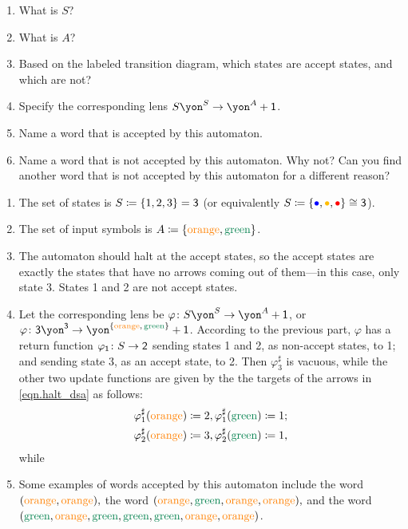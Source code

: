 \documentclass[Book-Poly]{subfiles}
\begin{document}
\begin{exercise}
\begin{enumerate}
	\item What is $S$?
	\item What is $A$?
	\item Based on the labeled transition diagram, which states are accept states, and which are not?
	\item Specify the corresponding lens $S\yon^S\to\yon^A+\1$.
	\item Name a word that is accepted by this automaton.
	\item Name a word that is not accepted by this automaton.
	Why not?
	Can you find another word that is not accepted by this automaton for a different reason?
\qedhere
\end{enumerate}
\begin{solution}
\begin{enumerate}
    \item The set of states is $S\coloneqq\{1,2,3\}=\textsf{3}$ (or equivalently $S\coloneqq\{\bul[blue],\bul[dyellow],\bul[red]\}\iso\3$).
    \item The set of input symbols is $A\coloneqq\{{\color{orange}\text{orange}},{\color{dgreen}\text{green}}\}$.
    \item The automaton should halt at the accept states, so the accept states are exactly the states that have no arrows coming out of them---in this case, only state 3.
    States 1 and 2 are not accept states.
    \item Let the corresponding lens be $\varphi\colon S\yon^S\to\yon^A+\1$, or $\varphi\colon \3\yon^\3\to\yon^{\{{\color{orange}\text{orange}},\,{\color{dgreen}\text{green}}\}}+\1$.
    According to the previous part, $\varphi$ has a return function $\varphi_{\textsf{1}}\colon S\to\textsf{2}$ sending states 1 and 2, as non-accept states, to 1; and sending state 3, as an accept state, to 2.
    Then $\varphi^\sharp_3$ is vacuous, while the other two update functions are given by the the targets of the arrows in \eqref{eqn.halt_dsa} as follows:
    \begin{align*}
        \varphi^\sharp_1({\color{orange}\text{orange}})\coloneqq2&,\varphi^\sharp_1({\color{dgreen}\text{green}})\coloneqq1;\\
        \varphi^\sharp_2({\color{orange}\text{orange}})\coloneqq3&,\varphi^\sharp_2({\color{dgreen}\text{green}})\coloneqq1,
    \end{align*}
    while
    \item Some examples of words accepted by this automaton include the word $({\color{orange}\text{orange}},{\color{orange}\text{orange}}),$ the word $({\color{orange}\text{orange}},{\color{dgreen}\text{green}},{\color{orange}\text{orange}},{\color{orange}\text{orange}}),$ and the word $({\color{dgreen}\text{green}},{\color{orange}\text{orange}},{\color{dgreen}\text{green}},{\color{dgreen}\text{green}},{\color{dgreen}\text{green}},{\color{orange}\text{orange}},{\color{orange}\text{orange}})$.

\end{enumerate}
\end{solution}
\end{exercise}
\end{document}
